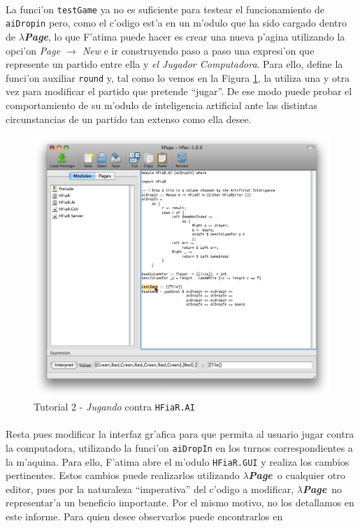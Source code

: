 \documentclass[a4paper]{article}
\newcommand{\hpage}{\textbf{\textsl{$\lambda$Page}}}
\begin{document}
\paragraph{} La funci'on \texttt{testGame} ya no es suficiente para testear el funcionamiento de \texttt{aiDropin} pero, como el c'odigo est'a en un m'odulo que ha sido cargado dentro de \hpage, lo que F'atima puede hacer es crear una nueva p'agina utilizando la opci'on \textsl{Page $\rightarrow$ New} e ir construyendo paso a paso una expresi'on que represente un partido entre ella y \textsl{el Jugador Computadora}.  Para ello, define la funci'on auxiliar \texttt{round} y, tal como lo vemos en la Figura \ref{tut210}, la utiliza una y otra vez para modificar el partido que pretende ``jugar''.  De ese modo puede probar el comportamiento de su m'odulo de inteligencia artificial ante las distintas circunstancias de un partido tan extenso como ella desee.
\begin{figure}[hp]
	\begin{center}
        	\includegraphics[width=.75\textwidth]{pictures/tut2/08}
		\caption{Tutorial 2 - \textsl{Jugando} contra \texttt{HFiaR.AI}}
		\label{tut210}
	\end{center}
\end{figure}
\paragraph{}Resta pues modificar la interfaz gr'afica para que permita al usuario jugar contra la computadora, utilizando la funci'on \texttt{aiDropIn} en los turnos correspondientes a la m'aquina.  Para ello, F'atima abre el m'odulo \texttt{HFiaR.GUI} y realiza los cambios pertinentes.  Estos cambios puede realizarlos utilizando \hpage\ o cualquier otro editor, pues por la naturaleza ``imperativa'' del c'odigo a modificar, \hpage\ no representar'a un beneficio importante.  Por el mismo motivo, no los detallamos en este informe.  Para quien desee observarlos puede encontrarlos en ~\cite{hfiar}
\end{document}
